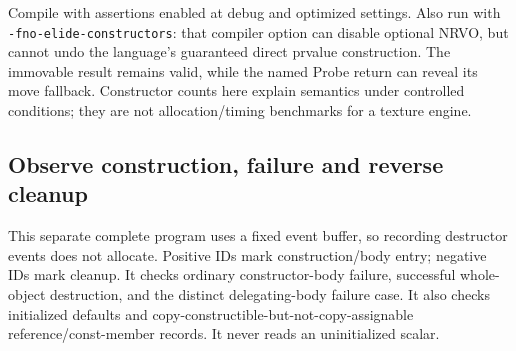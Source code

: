 Compile with assertions enabled at debug and optimized settings. Also run with \texttt{-fno-elide-constructors}: that compiler option can disable optional NRVO, but cannot undo the language's guaranteed direct prvalue construction. The immovable result remains valid, while the named Probe return can reveal its move fallback. Constructor counts here explain semantics under controlled conditions; they are not allocation/timing benchmarks for a texture engine.

\subsection{Observe construction, failure and reverse cleanup}\label{05-engine-i-ch004-observe-construction-failure-and-reverse-cleanup}

This separate complete program uses a fixed event buffer, so recording destructor events does not allocate. Positive IDs mark construction/body entry; negative IDs mark cleanup. It checks ordinary constructor-body failure, successful whole-object destruction, and the distinct delegating-body failure case. It also checks initialized defaults and copy-constructible-but-not-copy-assignable reference/const-member records. It never reads an uninitialized scalar.


